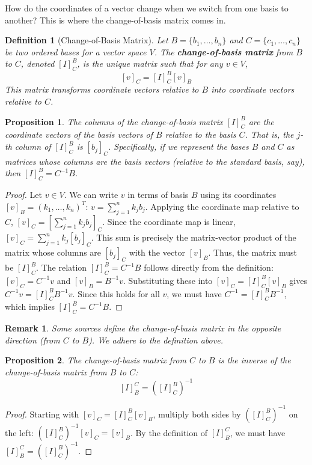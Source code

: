\documentclass[11pt, a4paper]{article}
\theoremstyle{mydefinitionstyle}
\newtheorem{definition}{Definition}[section]
\newtheorem{remark}{Remark}[section]
\theoremstyle{mytheoremstyle}
\newtheorem{proposition}{Proposition}[section]
\begin{document}
How do the coordinates of a vector change when we switch from one basis to another? This is where the change-of-basis matrix comes in.

\begin{definition}[Change-of-Basis Matrix] \label{def:change_basis}
    Let $B = \{b_1, \dots, b_n\}$ and $C = \{c_1, \dots, c_n\}$ be two ordered bases for a vector space $V$. The \textbf{change-of-basis matrix} from $B$ to $C$, denoted $[I]_C^B$, is the unique matrix such that for any $v \in V$,
    \[ [v]_C = [I]_C^B [v]_B \]
    This matrix transforms coordinate vectors relative to $B$ into coordinate vectors relative to $C$.
\end{definition}

\begin{proposition} \label{prop:change_basis_cols}
    The columns of the change-of-basis matrix $[I]_C^B$ are the coordinate vectors of the basis vectors of $B$ relative to the basis $C$. That is, the $j$-th column of $[I]_C^B$ is $[b_j]_C$.
    Specifically, if we represent the bases $B$ and $C$ as matrices whose columns are the basis vectors (relative to the standard basis, say), then $[I]_C^B = C^{-1}B$.
\end{proposition}
\begin{proof}
    Let $v \in V$. We can write $v$ in terms of basis $B$ using its coordinates $[v]_B = (k_1, \dots, k_n)^T$: $v = \sum_{j=1}^n k_j b_j$.
    Applying the coordinate map relative to $C$, $[v]_C = [\sum_{j=1}^n k_j b_j]_C$. Since the coordinate map is linear, $[v]_C = \sum_{j=1}^n k_j [b_j]_C$.
    This sum is precisely the matrix-vector product of the matrix whose columns are $[b_j]_C$ with the vector $[v]_B$. Thus, the matrix must be $[I]_C^B$.
    The relation $[I]_C^B = C^{-1}B$ follows directly from the definition: $[v]_C = C^{-1}v$ and $[v]_B = B^{-1}v$. Substituting these into $[v]_C = [I]_C^B [v]_B$ gives $C^{-1}v = [I]_C^B B^{-1}v$. Since this holds for all $v$, we must have $C^{-1} = [I]_C^B B^{-1}$, which implies $[I]_C^B = C^{-1}B$.
\end{proof}

\begin{remark}
    Some sources define the change-of-basis matrix in the opposite direction (from $C$ to $B$). We adhere to the definition above.
\end{remark}

\begin{proposition} \label{prop:change_basis_inverse}
    The change-of-basis matrix from $C$ to $B$ is the inverse of the change-of-basis matrix from $B$ to $C$:
    \[ [I]_B^C = ([I]_C^B)^{-1} \]
\end{proposition}
\begin{proof}
    Starting with $[v]_C = [I]_C^B [v]_B$, multiply both sides by $([I]_C^B)^{-1}$ on the left: $([I]_C^B)^{-1} [v]_C = [v]_B$. By the definition of $[I]_B^C$, we must have $[I]_B^C = ([I]_C^B)^{-1}$.
\end{proof}
\end{document}
